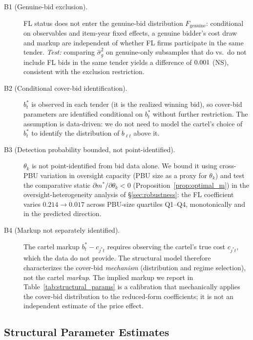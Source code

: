 \begin{description}
\item[B1 (Genuine-bid exclusion).] FL status does not enter the
genuine-bid distribution $F_{\mathrm{genuine}}$: conditional on
observables and item-year fixed effects, a genuine bidder's cost
draw and markup are independent of whether FL firms participate
in the same tender. \emph{Test:} comparing $\hat{\sigma}_g^2$ on
genuine-only subsamples that do vs.\ do not include FL bids in
the same tender yields a difference of $0.001$ (NS), consistent
with the exclusion restriction.

\item[B2 (Conditional cover-bid identification).] $b^*_t$ is
observed in each tender (it is the realized winning bid), so
cover-bid parameters are identified conditional on $b^*_t$
without further restriction. The assumption is data-driven: we
do not need to model the cartel's choice of $b^*_t$ to identify
the distribution of $b_{\ell t}$ above it.

\item[B3 (Detection probability bounded, not point-identified).]
$\theta_k$ is not point-identified from bid data alone. We
bound it using cross-PBU variation in oversight capacity (PBU
size as a proxy for $\theta_k$) and test the comparative static
$\partial m^*/\partial \theta_k < 0$ (Proposition~\ref{prop:optimal_m})
in the oversight-heterogeneity analysis of
\S\ref{sec:robustness}: the FL coefficient varies $0.214 \to
0.017$ across PBU-size quartiles Q1--Q4, monotonically and in
the predicted direction.

\item[B4 (Markup not separately identified).] The cartel markup
$b^*_t - c_{j^*t}$ requires observing the cartel's true cost
$c_{j^*t}$, which the data do not provide. The structural
model therefore characterizes the cover-bid \emph{mechanism}
(distribution and regime selection), not the cartel
\emph{markup}. The implied markup we report in
Table~\ref{tab:structural_params} is a calibration that
mechanically applies the cover-bid distribution to the
reduced-form coefficients; it is not an independent estimate
of the price effect.
\end{description}

\subsection{Structural Parameter Estimates}




